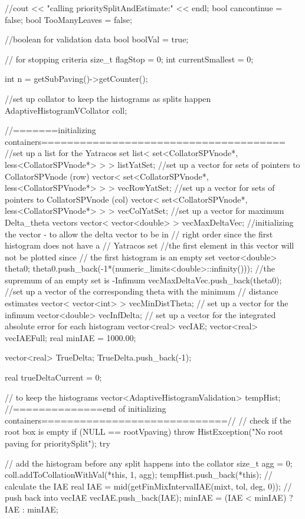 \begin{DoxyCode}
{
    //cout << "calling prioritySplitAndEstimate:" << endl;
   bool cancontinue = false;
   bool TooManyLeaves = false;
   
    //boolean for validation data
    bool boolVal = true;
    
    // for stopping criteria
    size_t flagStop = 0;
    int currentSmallest = 0;
    
    int n = getSubPaving()->getCounter();
    
    //set up collator to keep the histograms as splits happen
    AdaptiveHistogramVCollator coll;
    
   //=======initializing containers======================================
  //set up a list for the Yatracos set 
  list< set<CollatorSPVnode*, less<CollatorSPVnode*> > > listYatSet;
  //set up a vector for sets of pointers to CollatorSPVnode (row)
  vector< set<CollatorSPVnode*, less<CollatorSPVnode*> > > vecRowYatSet;
  //set up a vector for sets of pointers to CollatorSPVnode (col)
  vector< set<CollatorSPVnode*, less<CollatorSPVnode*> > > vecColYatSet;    
  //set up a vector for maximum Delta_theta vectors
  vector< vector<double> > vecMaxDeltaVec;
  //initializing the vector - to allow the delta vector to be in 
  // right order  since the first histogram does not have a 
  // Yatracos set
  //the first element in this vector will not be plotted since 
  // the first histogram is an empty set
  vector<double> theta0;
  theta0.push_back(-1*(numeric_limits<double>::infinity())); 
  //the supremum of an empty set is -Infimum 
  vecMaxDeltaVec.push_back(theta0);
  //set up a vector of the corresponding theta with the minimum 
  // distance estimates
  vector< vector<int> > vecMinDistTheta;
  // set up a vector for the infimum 
  vector<double> vecInfDelta;
  // set up a vector for the integrated absolute error for each histogram
   vector<real> vecIAE; 
   vector<real> vecIAEFull;
   real minIAE = 1000.00;
   
   vector<real> TrueDelta;
   TrueDelta.push_back(-1); 

  real trueDeltaCurrent = 0;
  
   // to keep the histograms
   vector<AdaptiveHistogramValidation> tempHist;
   //==============end of initializing
       containers=============================//   
   // check if the root box is empty
    if (NULL == rootVpaving) {
            throw HistException("No root paving for prioritySplit");
    }
    try {       
        // add the histogram before any split happens into the collator
        size_t agg = 0;
      coll.addToCollationWithVal(*this, 1, agg);
      tempHist.push_back(*this);
      // calculate the IAE 
      real IAE = mid(getFinMixIntervalIAE(mixt, tol, deg, 0));
      // push back into vecIAE 
      vecIAE.push_back(IAE);
      minIAE = (IAE < minIAE) ? IAE : minIAE;
      
}}
\end{DoxyCode}
